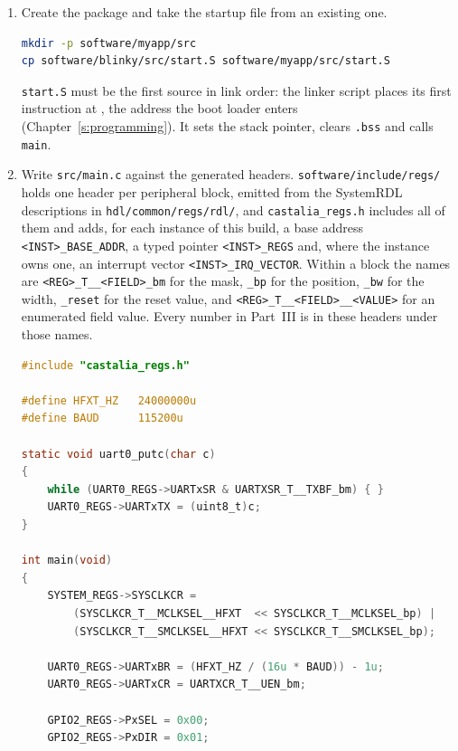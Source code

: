 \documentclass[11pt,pdftex,openany,letterpaper]{report}
\begin{document}
\begin{enumerate}[itemsep=1pt]
	\item Create the package and take the startup file from an existing one.
\begin{lstlisting}[language=bash]
mkdir -p software/myapp/src
cp software/blinky/src/start.S software/myapp/src/start.S
\end{lstlisting}
	\texttt{start.S} must be the first source in link order: the linker script places its first instruction at \texttt{\SpiFlashProgramAddress}, the address the boot loader enters (Chapter~\ref{s:programming}). It sets the stack pointer, clears \texttt{.bss} and calls \texttt{main}.
	\item Write \texttt{src/main.c} against the generated headers. \texttt{software/include/regs/} holds one header per peripheral block, emitted from the SystemRDL descriptions in \texttt{hdl/common/regs/rdl/}, and \texttt{castalia\_regs.h} includes all of them and adds, for each instance of this build, a base address \texttt{<INST>\_BASE\_ADDR}, a typed pointer \texttt{<INST>\_REGS} and, where the instance owns one, an interrupt vector \texttt{<INST>\_IRQ\_VECTOR}. Within a block the names are \texttt{<REG>\_T\_\_<FIELD>\_bm} for the mask, \texttt{\_bp} for the position, \texttt{\_bw} for the width, \texttt{\_reset} for the reset value, and \texttt{<REG>\_T\_\_<FIELD>\_\_<VALUE>} for an enumerated field value. Every number in Part~III is in these headers under those names.
\begin{lstlisting}[language=C]
#include "castalia_regs.h"

#define HFXT_HZ   24000000u
#define BAUD      115200u

static void uart0_putc(char c)
{
    while (UART0_REGS->UARTxSR & UARTXSR_T__TXBF_bm) { }
    UART0_REGS->UARTxTX = (uint8_t)c;
}

int main(void)
{
    SYSTEM_REGS->SYSCLKCR =
        (SYSCLKCR_T__MCLKSEL__HFXT  << SYSCLKCR_T__MCLKSEL_bp) |
        (SYSCLKCR_T__SMCLKSEL__HFXT << SYSCLKCR_T__SMCLKSEL_bp);

    UART0_REGS->UARTxBR = (HFXT_HZ / (16u * BAUD)) - 1u;
    UART0_REGS->UARTxCR = UARTXCR_T__UEN_bm;

    GPIO2_REGS->PxSEL = 0x00;
    GPIO2_REGS->PxDIR = 0x01;


\end{lstlisting}
\end{enumerate}
\end{document}
